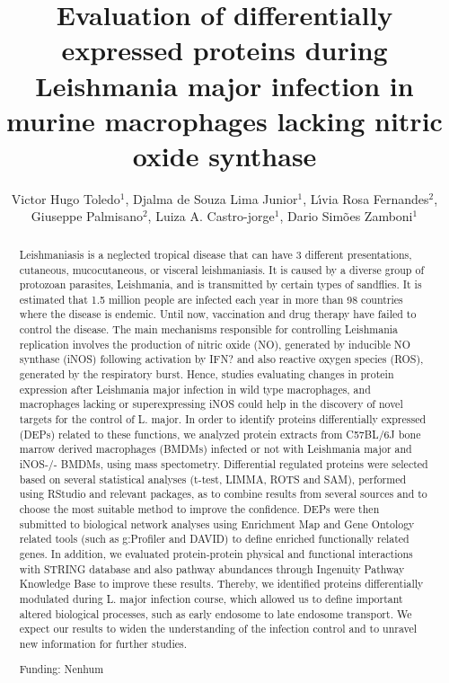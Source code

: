 \documentclass[twoside]{article}
\title{\vspace{-15mm}\fontsize{24pt}{10pt}\selectfont\textbf{Evaluation of differentially expressed proteins during Leishmania major infection in murine macrophages lacking nitric oxide synthase}} %
\author{Victor Hugo Toledo$^1$, Djalma de Souza Lima Junior$^1$, L\'{\i}via Rosa Fernandes$^2$, Giuseppe Palmisano$^2$, Luiza A. Castro-jorge$^1$, Dario Sim\~oes Zamboni$^1$}
\affil{1 FACULDADE DE MEDICINA DE RIBEIR\~AO PRETO - USP\\ 2 INSTITUTO DE CI\^ENCIAS BIOM\'EDICAS - USP\\ }
\date{}
\begin{document}
\maketitle %

\thispagestyle{fancy} %


\begin{abstract}
Leishmaniasis is a neglected tropical disease that can have 3 different presentations, cutaneous, mucocutaneous, or visceral leishmaniasis. It is caused by a diverse group of protozoan parasites, Leishmania, and is transmitted by certain types of sandflies. It is estimated that 1.5 million people are infected each year in more than 98 countries where the disease is endemic. Until now, vaccination and drug therapy have failed to control the disease. The main mechanisms responsible for controlling Leishmania replication involves the production of nitric oxide (NO), generated by inducible NO synthase (iNOS) following activation by IFN? and also reactive oxygen species (ROS), generated by the respiratory burst. Hence, studies evaluating changes in protein expression after Leishmania major infection in wild type macrophages, and macrophages lacking or superexpressing iNOS could help in the discovery of novel targets for the control of L. major. In order to identify proteins differentially expressed (DEPs) related to these functions, we analyzed protein extracts from C57BL/6J bone marrow derived macrophages (BMDMs) infected or not with Leishmania major and iNOS-/- BMDMs, using mass spectometry. Differential regulated proteins were selected based on several statistical analyses (t-test, LIMMA, ROTS and SAM), performed using RStudio and relevant packages, as to combine results from several sources and to choose the most suitable method to improve the confidence. DEPs were then submitted to biological network analyses using Enrichment Map and Gene Ontology related tools (such as g:Profiler and DAVID)  to define enriched functionally related genes. In addition, we evaluated protein-protein physical and functional interactions with STRING database and also pathway abundances through Ingenuity Pathway Knowledge Base to improve these results. Thereby, we identified proteins differentially modulated during L. major infection course, which allowed us to define important altered biological processes, such as early endosome to late endosome transport. We expect our results to widen the understanding of the infection control and to unravel new information for further studies.

Funding: Nenhum
\end{abstract}
\end{document}
